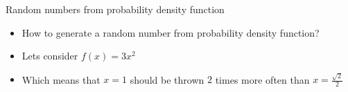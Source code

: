 \begin{slide}[toc=Random from PDF]{Random numbers from probability density function}
\null\vfill

  \twocolumn
  {
    \begin{itemize}
      \item How to generate a random number from probability density function?
      \item Lets consider $f(x) = 3x^2$
      \item Which means that $x = 1$ should be thrown $2$ times more often than $x = \frac{\sqrt{2}}{2}$
    \end{itemize}
  }
  {
    
  }

\vfill\null
\end{slide}




